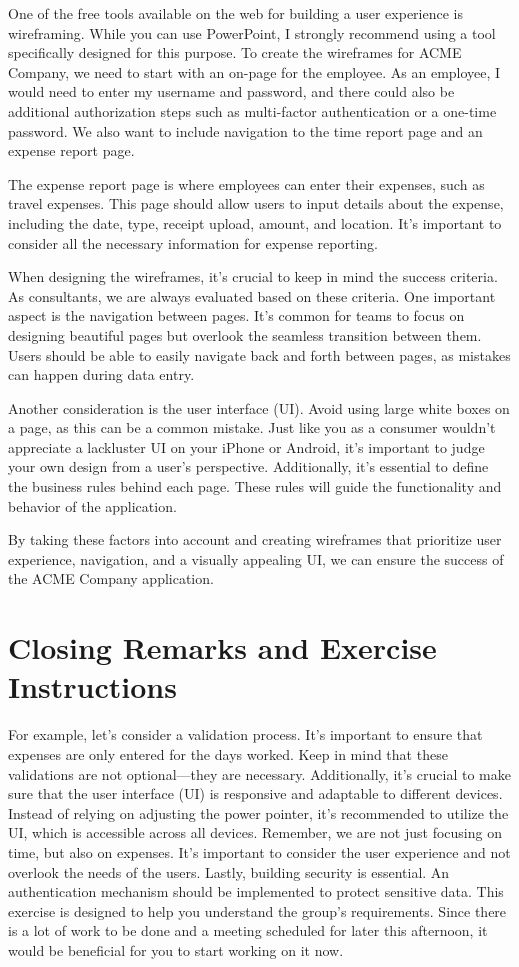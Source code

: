 One of the free tools available on the web for building a user
experience is wireframing. While you can use PowerPoint, I strongly
recommend using a tool specifically designed for this purpose. To create
the wireframes for ACME Company, we need to start with an on-page for
the employee. As an employee, I would need to enter my username and
password, and there could also be additional authorization steps such as
multi-factor authentication or a one-time password. We also want to
include navigation to the time report page and an expense report page.

The expense report page is where employees can enter their expenses,
such as travel expenses. This page should allow users to input details
about the expense, including the date, type, receipt upload, amount, and
location. It's important to consider all the necessary information for
expense reporting.

When designing the wireframes, it's crucial to keep in mind the success
criteria. As consultants, we are always evaluated based on these
criteria. One important aspect is the navigation between pages. It's
common for teams to focus on designing beautiful pages but overlook the
seamless transition between them. Users should be able to easily
navigate back and forth between pages, as mistakes can happen during
data entry.

Another consideration is the user interface (UI). Avoid using large
white boxes on a page, as this can be a common mistake. Just like you as
a consumer wouldn't appreciate a lackluster UI on your iPhone or
Android, it's important to judge your own design from a user's
perspective. Additionally, it's essential to define the business rules
behind each page. These rules will guide the functionality and behavior
of the application.

By taking these factors into account and creating wireframes that
prioritize user experience, navigation, and a visually appealing UI, we
can ensure the success of the ACME Company application.

\section{Closing Remarks and Exercise
  Instructions}\label{closing-remarks-and-exercise-instructions}

For example, let's consider a validation process. It's important to
ensure that expenses are only entered for the days worked. Keep in mind
that these validations are not optional---they are necessary.
Additionally, it's crucial to make sure that the user interface (UI) is
responsive and adaptable to different devices. Instead of relying on
adjusting the power pointer, it's recommended to utilize the UI, which
is accessible across all devices. Remember, we are not just focusing on
time, but also on expenses. It's important to consider the user
experience and not overlook the needs of the users. Lastly, building
security is essential. An authentication mechanism should be implemented
to protect sensitive data. This exercise is designed to help you
understand the group's requirements. Since there is a lot of work to be
done and a meeting scheduled for later this afternoon, it would be
beneficial for you to start working on it now.
